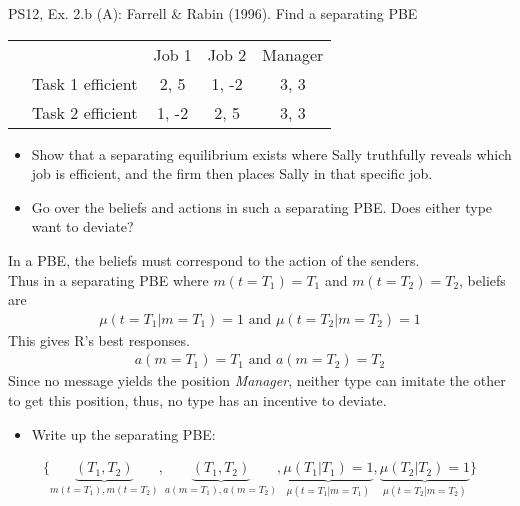 \begin{frame}{PS12, Ex. 2.b (A): Farrell \& Rabin (1996). Find a separating PBE}
    \begin{table}
      \begin{tabular}{ll|c|c|c|}
          & \multicolumn{1}{c}{} & \multicolumn{1}{c}{Job 1} & \multicolumn{1}{c}{Job 2} & \multicolumn{1}{c}{Manager} \\\cline{3-5}
          \parbox[t]{20mm}{}
           & Task 1 efficient & 2, 5 & 1, -2 & 3, 3 \\
           & Task 2 efficient & 1, -2 & 2, 5 & 3, 3 \\
      \end{tabular}
    \end{table}\vspace{-12pt}
    \begin{itemize}
      \item[(b)] Show that a separating equilibrium exists where Sally truthfully reveals which job is efficient, and the firm then places Sally in that specific job.
      \item[Step 1:] Go over the beliefs and actions in such a separating PBE. Does either type want to deviate?
    \end{itemize}\vspace{-6pt}
    In a PBE, the beliefs must correspond to the action of the senders.\\
    Thus in a separating PBE where $m(t=T_1)=T_1$ and $m(t=T_2)=T_2$, beliefs are\vspace{-2pt}
    \begin{align*}
      \mu(t=T_1|m=T_1)=1\text{ and }\mu(t=T_2|m=T_2)=1
    \end{align*}
    This gives R's best responses.
    \vspace{-2pt}
    \begin{align*}
      a(m=T_1)=T_1\text{ and }a(m=T_2)=T_2
    \end{align*}
    Since no message yields the position \textit{Manager}, neither type can imitate the other to get this position, thus, no type has an incentive to deviate.\vspace{-6pt}
    \begin{itemize}
      \item[Step 2:] Write up the separating PBE:
    \end{itemize}\vspace{-6pt}
    \begin{align*}
      \{\underbrace{(T_1,T_2)}_{m(t=T_1),m(t=T_2)},\underbrace{(T_1,T_2)}_{a(m=T_1),a(m=T_2)},\underbrace{\mu(T_1|T_1)=1}_{\mu(t=T_1|m=T_1)},\underbrace{\mu(T_2|T_2)=1}_{\mu(t=T_2|m=T_2)}\}
    \end{align*}
    \vfill\null
\end{frame}


